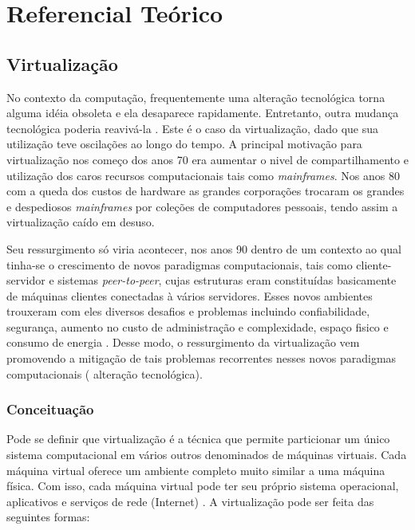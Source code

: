 \chapter{Referencial Teórico}
\label{cap:referencial_teorico}
\section{Virtualização}
No contexto da computação, frequentemente uma alteração tecnológica torna alguma idéia obsoleta e ela desaparece rapidamente. Entretanto, outra mudança tecnológica poderia reavivá-la \cite{tanembaum}. Este é o caso da virtualização, dado que sua utilização teve oscilações ao longo do tempo. A principal motivação para virtualização nos começo dos anos 70 era aumentar o nivel de compartilhamento e utilização dos caros recursos computacionais tais como \textit{mainframes}\cite{menasce}. Nos anos 80 com a queda dos custos de hardware as grandes corporações trocaram os grandes e despediosos \textit{mainframes} por coleções de computadores pessoais, tendo assim a virtualização caído em desuso.

 Seu ressurgimento só viria acontecer, nos anos 90 dentro de um contexto ao qual tinha-se o crescimento de novos paradigmas computacionais, tais como cliente-servidor  e sistemas \textit{peer-to-peer}, cujas estruturas eram constituídas basicamente de máquinas clientes conectadas à vários servidores. Esses novos ambientes trouxeram com eles diversos desafios e problemas incluindo confiabilidade, segurança, aumento no custo de administração e complexidade, espaço fisico e consumo de energia \cite{menasce}. Desse modo, o ressurgimento da virtualização vem promovendo a mitigação de tais problemas recorrentes nesses novos paradigmas computacionais ( alteração tecnológica).
 
\subsection{Conceituação} 
Pode se definir que virtualização é a técnica que permite particionar um único sistema computacional em vários outros denominados de máquinas virtuais. Cada máquina virtual oferece um ambiente completo muito similar a uma máquina física. Com isso, cada máquina virtual pode ter seu próprio sistema operacional, aplicativos e serviços de rede (Internet) \cite{carissimi}. A virtualização pode ser feita das seguintes formas:

